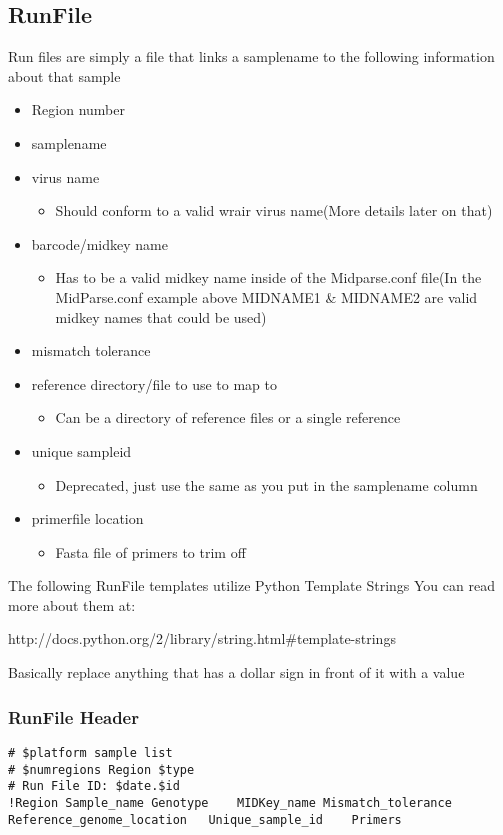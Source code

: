 \documentclass{article}
\begin{document}
 \subsection{RunFile}
Run files are simply a file that links a samplename to the following information about that sample
\begin{itemize}
 \item Region number
 \item samplename
 \item virus name
  \begin{itemize}
   \item Should conform to a valid wrair virus name(More details later on that)
  \end{itemize}
 \item barcode/midkey name
  \begin{itemize}
   \item Has to be a valid midkey name inside of the Midparse.conf file(In the MidParse.conf example above MIDNAME1 \& MIDNAME2 are valid midkey names that could be used)
  \end{itemize}
 \item mismatch tolerance
 \item reference directory/file to use to map to
  \begin{itemize}
   \item Can be a directory of reference files or a single reference
  \end{itemize}
 \item unique sampleid
  \begin{itemize}
   \item Deprecated, just use the same as you put in the samplename column
  \end{itemize}
 \item primerfile location
  \begin{itemize}
   \item Fasta file of primers to trim off
  \end{itemize}
\end{itemize}

The following RunFile templates utilize Python Template Strings
You can read more about them at:

http://docs.python.org/2/library/string.html\#template-strings

Basically replace anything that has a dollar sign in front of it with a value

\subsubsection{RunFile Header}
\begin{lstlisting}[basicstyle=\tiny]
# $platform sample list
# $numregions Region $type
# Run File ID: $date.$id
!Region	Sample_name	Genotype	MIDKey_name	Mismatch_tolerance	Reference_genome_location	Unique_sample_id	Primers	
\end{lstlisting}
\end{document}
